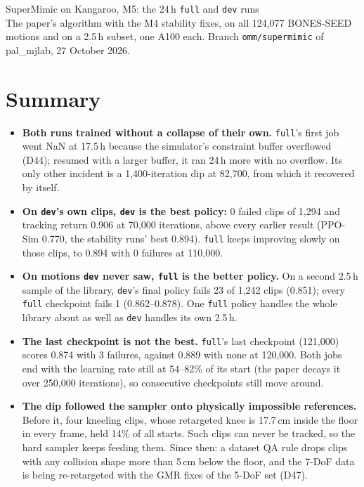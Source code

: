 \documentclass[10pt]{article}
\begin{document}
\sloppy

\begin{center}
{\LARGE SuperMimic on Kangaroo, M5: the 24\,h \texttt{full} and \texttt{dev} runs}\\[4pt]
The paper's algorithm with the M4 stability fixes, on all 124,077 BONES-SEED motions and on a 2.5\,h subset,
one A100 each. Branch \texttt{omm/supermimic} of pal\_mjlab, 27 October 2026.
\end{center}

\section*{Summary}

\begin{itemize}
  \item \textbf{Both runs trained without a collapse of their own.} \texttt{full}'s first job went NaN at
  17.5\,h because the simulator's constraint buffer overflowed (D44); resumed with a larger buffer, it ran
  24\,h more with no overflow. Its only other incident is a 1,400-iteration dip at 82,700, from which it
  recovered by itself.
  \item \textbf{On \texttt{dev}'s own clips, \texttt{dev} is the best policy:} 0 failed clips of 1,294 and
  tracking return 0.906 at 70,000 iterations, above every earlier result (PPO-Sim 0.770, the stability
  runs' best 0.894). \texttt{full} keeps improving slowly on those clips, to 0.894 with 0 failures at 110,000.
  \item \textbf{On motions \texttt{dev} never saw, \texttt{full} is the better policy.} On a second 2.5\,h
  sample of the library, \texttt{dev}'s final policy fails 23 of 1,242 clips (0.851); every \texttt{full}
  checkpoint fails 1 (0.862--0.878). One \texttt{full} policy handles the whole library about as well as
  \texttt{dev} handles its own 2.5\,h.
  \item \textbf{The last checkpoint is not the best.} \texttt{full}'s last checkpoint (121,000) scores 0.874
  with 3 failures, against 0.889 with none at 120,000. Both jobs end with the learning rate still at
  54--82\% of its start (the paper decays it over 250,000 iterations), so consecutive checkpoints still move
  around.
  \item \textbf{The dip followed the sampler onto physically impossible references.} Before it, four
  kneeling clips, whose retargeted knee is 17.7\,cm inside the floor in every frame, held 14\% of all
  starts. Such clips can never be tracked, so the hard sampler keeps feeding them. Since then: a dataset QA
  rule drops clips with any collision shape more than 5\,cm below the floor, and the 7-DoF data is being
  re-retargeted with the GMR fixes of the 5-DoF set (D47).
\end{itemize}
\end{document}

